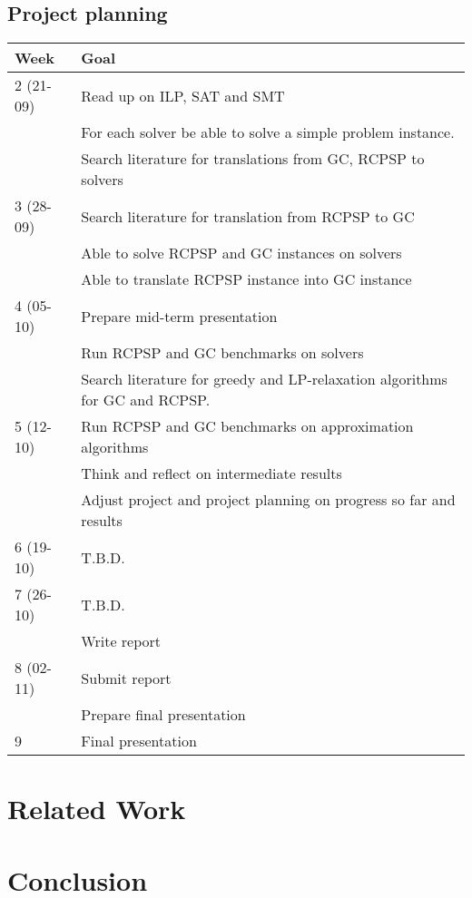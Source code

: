 \documentclass{sig-alternate}
\begin{document}
\newpage

\subsection{Project planning}

\begin{tabular}{| p{1.3cm} | p{6.0cm} |}
\hline
Week & Goal \\ \hline
2 (21-09) & Read up on ILP, SAT and SMT \\
 & For each solver be able to solve a simple problem instance. \\
 & Search literature for translations from GC, RCPSP to solvers \\ \hline
3 (28-09) & Search literature for translation from RCPSP to GC \\ 
 & Able to solve RCPSP and GC instances on solvers \\
 & Able to translate RCPSP instance into GC instance \\ \hline
4 (05-10) & Prepare mid-term presentation \\
 & Run RCPSP and GC benchmarks on solvers \\
 & Search literature for greedy and LP-relaxation algorithms for GC and RCPSP. \\ \hline
5 (12-10) & Run RCPSP and GC benchmarks on approximation algorithms \\ \hline
 & Think and reflect on intermediate results \\
 & Adjust project and project planning on progress so far and results \\ \hline
6 (19-10) & T.B.D. \\ \hline
7 (26-10) & T.B.D. \\
 & Write report \\ \hline
8 (02-11) & Submit report \\
 & Prepare final presentation \\ \hline
9 & Final presentation \\ \hline
\end{tabular}

\section{Related Work}

\section{Conclusion}
\end{document}
